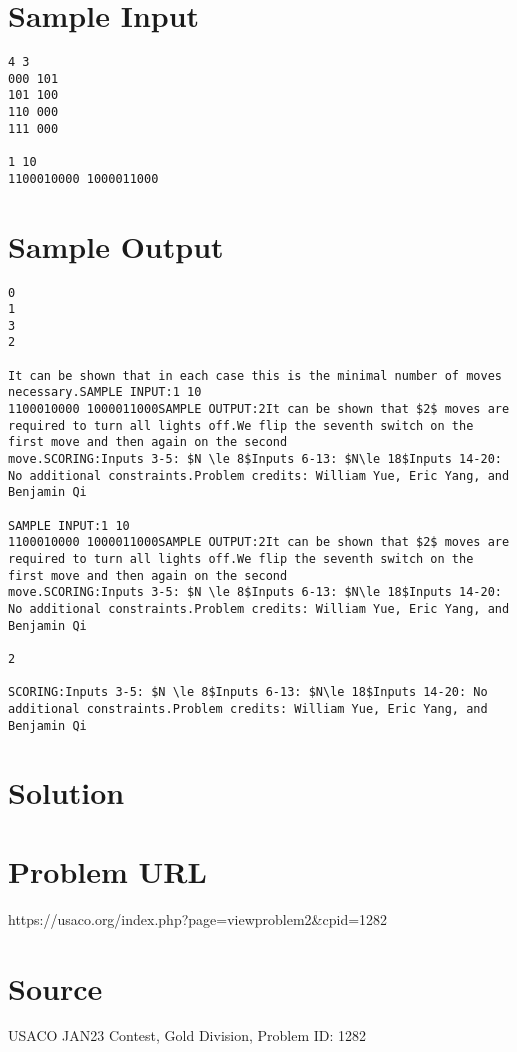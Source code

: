 \documentclass[12pt]{article}
\begin{document}
\section*{Sample Input}
\begin{verbatim}
4 3
000 101
101 100
110 000
111 000

1 10
1100010000 1000011000
\end{verbatim}

\section*{Sample Output}
\begin{verbatim}
0
1
3
2

It can be shown that in each case this is the minimal number of moves necessary.SAMPLE INPUT:1 10
1100010000 1000011000SAMPLE OUTPUT:2It can be shown that $2$ moves are required to turn all lights off.We flip the seventh switch on the first move and then again on the second
move.SCORING:Inputs 3-5: $N \le 8$Inputs 6-13: $N\le 18$Inputs 14-20: No additional constraints.Problem credits: William Yue, Eric Yang, and Benjamin Qi

SAMPLE INPUT:1 10
1100010000 1000011000SAMPLE OUTPUT:2It can be shown that $2$ moves are required to turn all lights off.We flip the seventh switch on the first move and then again on the second
move.SCORING:Inputs 3-5: $N \le 8$Inputs 6-13: $N\le 18$Inputs 14-20: No additional constraints.Problem credits: William Yue, Eric Yang, and Benjamin Qi

2

SCORING:Inputs 3-5: $N \le 8$Inputs 6-13: $N\le 18$Inputs 14-20: No additional constraints.Problem credits: William Yue, Eric Yang, and Benjamin Qi
\end{verbatim}

\section*{Solution}


\section*{Problem URL}
https://usaco.org/index.php?page=viewproblem2&cpid=1282

\section*{Source}
USACO JAN23 Contest, Gold Division, Problem ID: 1282
\end{document}

